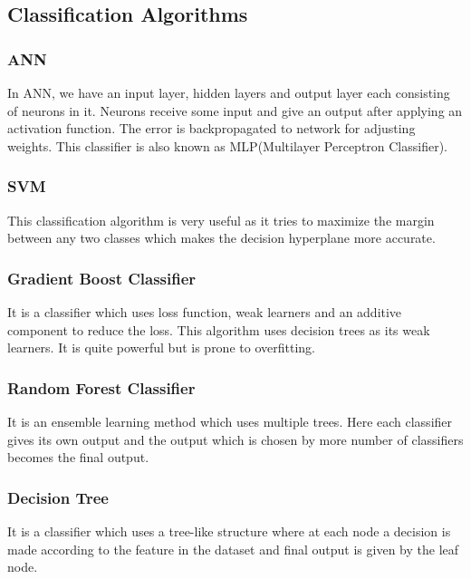\documentclass[conference]{IEEEtran}
\begin{document}
\subsection{Classification Algorithms}
\label{subsection:classificationAlgos}

\subsubsection{ANN}
\label{subsubsection:ann}
In ANN, we have an input layer, hidden layers and output layer each consisting of neurons in it\cite{book:ann}. Neurons receive some input and give an output after applying an activation function. The error is backpropagated to network for adjusting weights. This classifier is also known as MLP(Multilayer Perceptron Classifier).

\subsubsection{SVM}
\label{subsubsection:svm}
This classification algorithm is very useful as it tries to maximize the margin between any two classes which makes the decision hyperplane more accurate\cite{article:svm}. 

\subsubsection{Gradient Boost Classifier}
\label{subsubsection:gradientBoost}
It is a classifier which uses loss function, weak learners and an additive component to reduce the loss\cite{article:gradientBoosting}. This algorithm uses decision trees as its weak learners. It is quite powerful but is prone to overfitting.

\subsubsection{Random Forest Classifier}
\label{subsubsection:randomForestClassifier}
It is an ensemble learning method which uses multiple trees\cite{article:randomForest}. Here each classifier gives its own output and the output which is chosen by more number of classifiers becomes the final output.

\subsubsection{Decision Tree}
\label{subsubsection:decisionTree}
It is a classifier which uses a tree-like structure where at each node a decision is made according to the feature in the dataset and final output is given by the leaf node\cite{article:decisionTree}.
\end{document}
